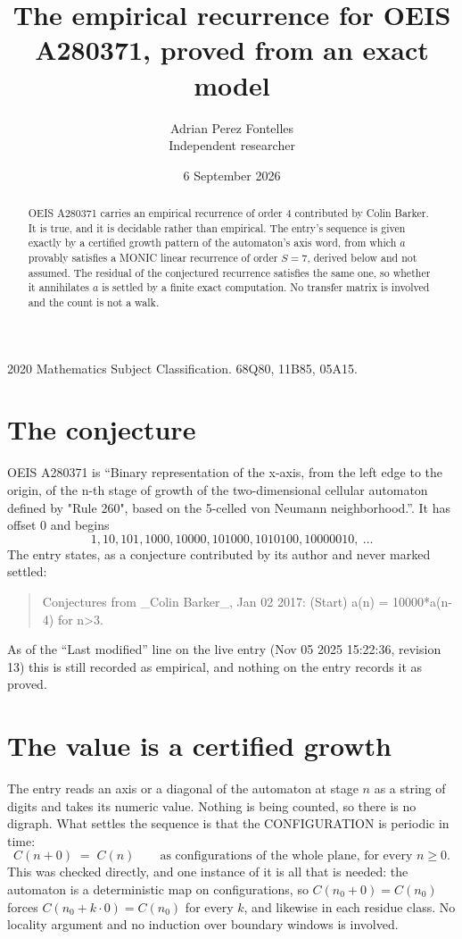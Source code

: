 \documentclass[11pt,a4paper]{article}
\title{The empirical recurrence for OEIS A280371, proved from an exact model}
\author{Adrian Perez Fontelles\\ \small Independent researcher}
\date{6 September 2026}
\theoremstyle{plain}
\theoremstyle{definition}
\begin{document}
\maketitle

\begin{abstract}
OEIS A280371 carries an empirical recurrence of order $4$ contributed by Colin Barker. It is true, and it is
decidable rather than empirical. The entry's sequence is given exactly by a certified growth pattern of the automaton's axis word, from
which $a$ provably satisfies a MONIC linear recurrence of order $S=7$, derived below and not
assumed. The residual of the conjectured recurrence satisfies the same one, so whether it
annihilates $a$ is settled by a finite exact computation. No transfer matrix is involved and
the count is not a walk.
\end{abstract}

\noindent\small 2020 Mathematics Subject Classification. 68Q80, 11B85, 05A15.\normalsize

\section{The conjecture}

OEIS A280371 is ``Binary representation of the x-axis, from the left edge to the origin, of the n-th stage of growth of the two-dimensional cellular automaton defined by "Rule 260", based on the 5-celled von Neumann neighborhood.''. It has offset $0$ and begins
\[
1, 10, 101, 1000, 10000, 101000, 1010100, 10000010,\ \dots
\]
The entry states, as a conjecture contributed by its author and never marked settled:
\begin{quote}
Conjectures from \_Colin Barker\_, Jan 02 2017: (Start) a(n) = 10000*a(n-4) for n>3.
\end{quote}
As of the ``Last modified'' line on the live entry (Nov 05 2025 15:22:36, revision 13)
this is still recorded as empirical, and nothing on the entry records it as proved.

\section{The value is a certified growth}

The entry reads an axis or a diagonal of the automaton at stage $n$ as a string of digits and
takes its numeric value. Nothing is being counted, so there is no digraph. What settles the
sequence is that the CONFIGURATION is periodic in time:
\[
C(n+0)\;=\;C(n)\qquad\text{as configurations of the whole plane, for every } n\ge 0.
\]
This was checked directly, and one instance of it is all that is needed: the automaton is a
deterministic map on configurations, so $C(n_0+0)=C(n_0)$ forces $C(n_0+k\cdot0)=C(n_0)$ for
every $k$, and likewise in each residue class. No locality argument and no induction over
boundary windows is involved.
\end{document}
